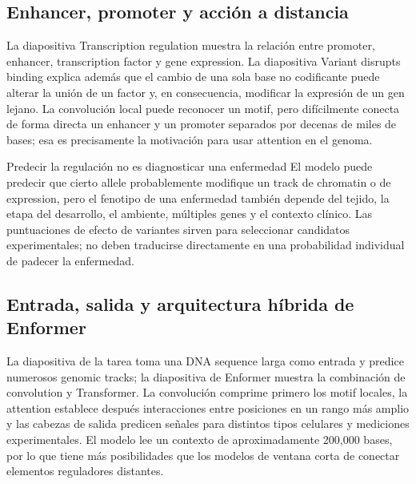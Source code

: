 \subsection{Enhancer, promoter y acción a distancia}

La diapositiva Transcription regulation muestra la relación entre promoter, enhancer, transcription factor y gene expression. La diapositiva Variant disrupts binding explica además que el cambio de una sola base no codificante puede alterar la unión de un factor y, en consecuencia, modificar la expresión de un gen lejano. La convolución local puede reconocer un motif, pero difícilmente conecta de forma directa un enhancer y un promoter separados por decenas de miles de bases; esa es precisamente la motivación para usar attention en el genoma.



\begin{warningbox}{Predecir la regulación no es diagnosticar una enfermedad}
El modelo puede predecir que cierto allele probablemente modifique un track de chromatin o de expression, pero el fenotipo de una enfermedad también depende del tejido, la etapa del desarrollo, el ambiente, múltiples genes y el contexto clínico. Las puntuaciones de efecto de variantes sirven para seleccionar candidatos experimentales; no deben traducirse directamente en una probabilidad individual de padecer la enfermedad.
\end{warningbox}

\subsection{Entrada, salida y arquitectura híbrida de Enformer}

La diapositiva de la tarea toma una DNA sequence larga como entrada y predice numerosos genomic tracks; la diapositiva de Enformer muestra la combinación de convolution y Transformer. La convolución comprime primero los motif locales, la attention establece después interacciones entre posiciones en un rango más amplio y las cabezas de salida predicen señales para distintos tipos celulares y mediciones experimentales. El modelo lee un contexto de aproximadamente 200,000 bases, por lo que tiene más posibilidades que los modelos de ventana corta de conectar elementos reguladores distantes.

